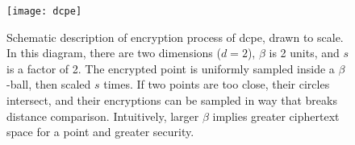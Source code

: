 \begin{figure}[h]
	\centering
	\texttt{[image: dcpe]}
	\caption[Schematic description of \acrshort{dcpe}]{
		Schematic description of encryption process of \acrshort{dcpe}, drawn to scale.
		In this diagram, there are two dimensions ($d = 2$), $\beta$ is 2 units, and $s$ is a factor of 2.
		The encrypted point is uniformly sampled inside a $\beta$-ball, then scaled $s$ times.
		If two points are too close, their circles intersect, and their encryptions can be sampled in way that breaks distance comparison.
		Intuitively, larger $\beta$ implies greater ciphertext space for a point and greater security.
	}\label{figure:dcpe}
\end{figure}
